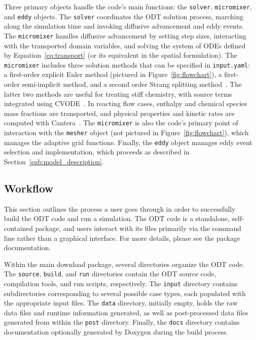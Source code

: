 \documentclass[preprint,12pt, a4paper]{elsarticle}
\begin{document}
Three primary objects handle the code's main functions: the \texttt{solver}, \texttt{micromixer}, and \texttt{eddy} objects. The \texttt{solver} coordinates the ODT solution process, marching along the simulation time and invoking diffusive advancement and eddy events. The \texttt{micromixer} handles diffusive advancement by setting step sizes, interacting with the transported domain variables, and solving the system of ODEs defined by Equation~\ref{eq:transport} (or its equivalent in the spatial formulation). The \texttt{micromixer} includes three solution methods that can be specified in \texttt{input.yaml}: a first-order explicit Euler method (pictured in Figure~\ref{fig:flowchart}), a first-order semi-implicit method, and a second order Strang splitting method~\cite{Strang_1968}. The latter two methods are useful for treating stiff chemistry, with source terms integrated using CVODE~\cite{Hindmarsh_2020}. In reacting flow cases, enthalpy and chemical species mass fractions are transported, and physical properties and kinetic rates are computed with Cantera~\cite{Goodwin_2018}. The \texttt{micromixer} is also the code's primary point of interaction with the \texttt{mesher} object (not pictured in Figure~\ref{fig:flowchart}), which manages the adaptive grid functions. Finally, the \texttt{eddy} object manages eddy event selection and implementation, which proceeds as described in Section~\ref{sub:model_description}.  

\subsection{Workflow}
\label{sub:workflow}

This section outlines the process a user goes through in order to successfully build the ODT code and run a simulation. The ODT code is a standalone, self-contained package, and users interact with its files primarily via the command line rather than a graphical interface. For more details, please see the package documentation.

Within the main download package, several directories organize the ODT code. The \texttt{source}, \texttt{build}, and \texttt{run} directories contain the ODT source code, compilation tools, and run scripts, respectively. The \texttt{input} directory contains subdirectories corresponding to several possible case types, each populated with the appropriate input files. The \texttt{data} directory, initially empty, holds the raw data files and runtime information generated, as well as post-processed data files generated from within the \texttt{post} directory. Finally, the \texttt{docs} directory contains documentation optionally generated by Doxygen \cite{vanHeesch_2018} during the build process. 
\end{document}
